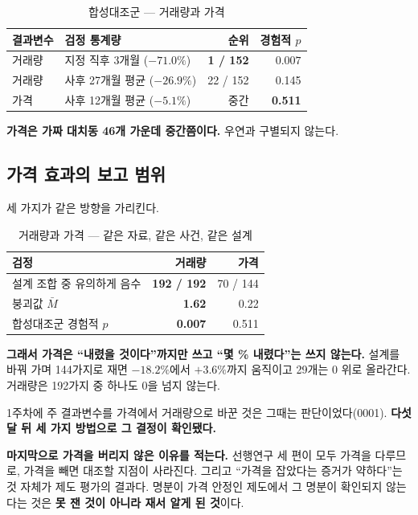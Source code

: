 \begin{table}[htbp]
  \centering
  \caption{합성대조군 --- 거래량과 가격}
  \label{tab:scm-compare}
  \begin{tabular}{llrr}
    \toprule
    \textbf{결과변수} & \textbf{검정 통계량} & \textbf{순위} &
    \textbf{경험적 $p$} \\
    \midrule
    거래량 & 지정 직후 3개월 ($-71.0\%$) & \textbf{1 / 152} &
      $\mathbf{0.007}$ \\
    거래량 & 사후 27개월 평균 ($-26.9\%$) & 22 / 152 & 0.145 \\
    가격 & 사후 12개월 평균 ($-5.1\%$) & 중간 & \textbf{0.511} \\
    \bottomrule
  \end{tabular}
\end{table}

\textbf{가격은 가짜 대치동 46개 가운데 중간쯤이다.} 우연과 구별되지 않는다.

\subsection{가격 효과의 보고 범위}

세 가지가 같은 방향을 가리킨다.

\begin{table}[htbp]
  \centering
  \caption{거래량과 가격 --- 같은 자료, 같은 사건, 같은 설계}
  \label{tab:vol-vs-price}
  \begin{tabular}{lrr}
    \toprule
    \textbf{검정} & \textbf{거래량} & \textbf{가격} \\
    \midrule
    설계 조합 중 유의하게 음수 & \textbf{192 / 192} & 70 / 144 \\
    붕괴값 $\bar{M}$ & \textbf{1.62} & 0.22 \\
    합성대조군 경험적 $p$ & \textbf{0.007} & 0.511 \\
    \bottomrule
  \end{tabular}
\end{table}

\textbf{그래서 가격은 ``내렸을 것이다''까지만 쓰고 ``몇 \% 내렸다''는 쓰지 않는다.}
설계를 바꿔 가며 144가지로 재면 $-18.2\%$에서 $+3.6\%$까지 움직이고 29개는 0 위로
올라간다. 거래량은 192가지 중 하나도 0을 넘지 않는다.

1주차에 주 결과변수를 가격에서 거래량으로 바꾼 것은 그때는 판단이었다(0001).
\textbf{다섯 달 뒤 세 가지 방법으로 그 결정이 확인됐다.}

\textbf{마지막으로 가격을 버리지 않은 이유를 적는다.} 선행연구 세 편이 모두 가격을
다루므로, 가격을 빼면 대조할 지점이 사라진다. 그리고 ``가격을 잡았다는 증거가
약하다''는 것 자체가 제도 평가의 결과다. 명분이 가격 안정인 제도에서 그 명분이
확인되지 않는다는 것은 \textbf{못 잰 것이 아니라 재서 알게 된 것}이다.
